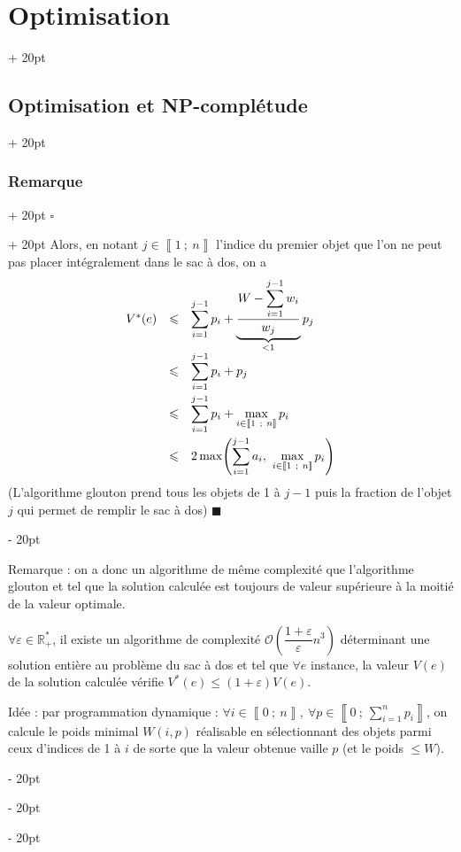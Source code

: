 \documentclass[a4paper, 12pt, twoside]{article}
\newcommand{\R}{\mathbb{R}} %
\newcommand{\nset}[2]{\left\llbracket #1\ ;\ #2 \right\rrbracket}
\newcommand{\lr}[1]{\left( #1 \right)}
\renewcommand{\le}{\leqslant}
\newcommand{\ind}[1][20pt]{\advance\leftskip + #1}
\newcommand{\deind}[1][20pt]{\advance\leftskip - #1}
\newenvironment{indt}[2][20pt]{#2 \par \ind[#1]}{\par \deind} %
\newenvironment{proof}[1][{}]{\begin{indt}{$\square$ #1}}{$\blacksquare$ \end{indt}}
\newcommand{\1}{\mathbbm 1}
\begin{document}
\begin{indt}{\section{Optimisation}}
\begin{indt}{\subsection{Optimisation et \textbf{NP}-complétude}}
\begin{indt}{\subsubsection{Remarque}}
\begin{proof}
                    Alors, en notant $j \in \nset 1 n$ l'indice du premier objet que l'on ne peut pas placer intégralement dans le sac à dos, on a
                    \[
                        \begin{array}{rcl}
                            V^*(e)
                            &\le& \displaystyle
                            \sum_{i = 1}^{j - 1} p_i
                            + \underbrace{\dfrac{\displaystyle W - \sum_{i = 1}^{j - 1} w_i}{w_j}}_{< 1} p_j
                            \\
                            &\le& \displaystyle
                            \sum_{i = 1}^{j - 1} p_i + p_j
                            \vspace{3pt}
                            \\
                            &\le& \displaystyle
                            \sum_{i = 1}^{j - 1} p_i + \max_{i \in \nset 1 n} p_i
                            \vspace{3pt}
                            \\
                            &\le& \displaystyle
                            2 \max\!\lr{\sum_{i = 1}^{j - 1} a_i,\ \max_{i \in \nset 1 n} p_i}
                        \end{array}
                    \]
                    (L'algorithme glouton prend tous les objets de 1 à $j - 1$ puis la fraction de l'objet $j$ qui permet de remplir le sac à dos)
                \end{proof}

                \vspace{12pt}
                
                Remarque : on a donc un algorithme de même complexité que l'algorithme glouton et tel que la solution calculée est toujours de valeur supérieure à la moitié de la valeur optimale.

                \vspace{12pt}
                
                 $\forall \varepsilon \in \R^*_+$, il existe un algorithme de complexité $\mathcal O\!\lr{\dfrac{1 + \varepsilon}{\varepsilon} n^3}$ déterminant une solution entière au problème du sac à dos et tel que $\forall e$ instance, la valeur $V(e)$ de la solution calculée vérifie $V^*(e) \le (1 + \varepsilon)V(e)$.

                Idée : par programmation dynamique : $\forall i \in \nset 0 n,\ \forall p \in \nset{0}{\displaystyle \sum_{i = 1}^n p_i}$, on calcule le poids minimal $W(i, p)$ réalisable en sélectionnant des objets parmi ceux d'indices de 1 à $i$ de sorte que la valeur obtenue vaille $p$ (et le poids $\le W$).


\end{indt}
\end{indt}
\end{indt}
\end{document}
